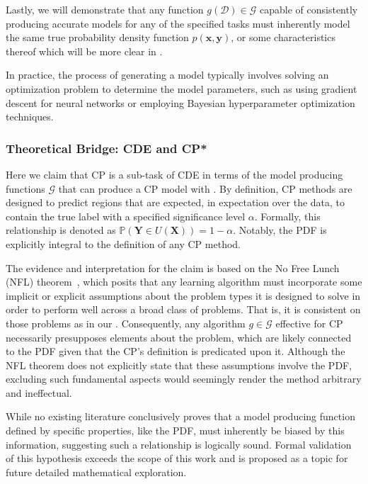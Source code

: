 Lastly, we will demonstrate that any function $g(\mathcal{D}) \in \mathcal{G}$ capable of consistently producing accurate models for any of the specified tasks must inherently model the same true probability density function $p(\mathbf{x}, \mathbf{y})$, or some characteristics thereof which will be more clear in .

In practice, the process of generating a model typically involves solving an optimization problem to determine the model parameters, such as using gradient descent for neural networks or employing Bayesian hyperparameter optimization techniques.

\subsubsection{Theoretical Bridge: CDE and CP*}\label{sec:bridge_cde_cp}

Here we claim that CP is a sub-task of CDE in terms of the model producing functions $\mathcal{G}$ that can produce a CP model with . By definition, CP methods are designed to predict regions that are expected, in expectation over the data, to contain the true label with a specified significance level $\alpha$. Formally, this relationship is denoted as $\mathbb{P}(\mathbf{Y} \in U(\mathbf{X})) = 1 - \alpha$. Notably, the PDF is explicitly integral to the definition of any CP method.

The evidence and interpretation for the claim is based on the No Free Lunch (NFL) theorem~\cite{wolpert1997no}, which posits that any learning algorithm must incorporate some implicit or explicit assumptions about the problem types it is designed to solve in order to perform well across a broad class of problems. That is, it is consistent on those problems as in our . Consequently, any algorithm $g \in \mathcal{G}$ effective for CP necessarily presupposes elements about the problem, which are likely connected to the PDF given that the CP's definition is predicated upon it. Although the NFL theorem does not explicitly state that these assumptions involve the PDF, excluding such fundamental aspects would seemingly render the method arbitrary and ineffectual.

While no existing literature conclusively proves that a model producing function defined by specific properties, like the PDF, must inherently be biased by this information, suggesting such a relationship is logically sound. Formal validation of this hypothesis exceeds the scope of this work and is proposed as a topic for future detailed mathematical exploration.

